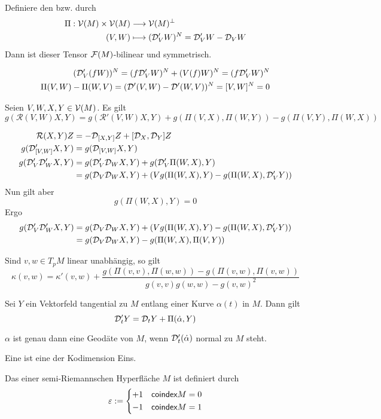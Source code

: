 \documentclass{book}
\newcommand{\Rc}{\mathcal{R}}
\begin{document}
\Lem{}
Definiere den  bzw.  durch
\begin{align*}
\Pi : \mathcal{V}(M) \times \mathcal{V}(M) &\overset{}{\longrightarrow} \mathcal{V}(M)^\bot\\
(V,W) & \longmapsto (\mathcal{D}'_VW)^N = \mathcal{D}'_VW - \mathcal{D}_VW
\end{align*}
Dann ist dieser Tensor $\mathcal{F}(M)$-bilinear und symmetrisch.
\begin{Beweis}{}
\begin{align*}
(\mathcal{D}'_V(fW))^N = (f\mathcal{D}'_VW)^N + (V(f) W)^N = (f\mathcal{D}'_VW)^N\\
\Pi(V,W) - \Pi(W,V) = (\mathcal{D}'(V,W) - \mathcal{D}'(W,V))^N = [V,W]^N = 0
\end{align*}
\end{Beweis}

Seien $V,W,X,Y \in \mathcal{V}(M)$. Es gilt
\[ g(\Rc(V,W)X,Y) = g(\Rc'(V,W)X,Y) + g(\Pi(V,X), \Pi(W,Y )) - g(\Pi(V,Y), \Pi(W,X )) \]
\begin{Beweis}{}
\begin{align*}
\Rc(X,Y)Z &= -\D_{[X,Y]}Z + [\D_X,\D_Y]Z\\
g(\D'_{[V,W]}X,Y) &= g(\D_{[V,W]}X,Y)\\
g(\D'_V\D'_WX,Y) &= g(\D'_V\D_WX,Y) + g(\D'_V \Pi(W,X), Y)\\
&= g(\D_V\D_WX,Y) + (Vg(\Pi(W,X), Y) - g(\Pi(W,X), \D'_VY ))\\
\end{align*}
Nun gilt aber
\[ g(\Pi(W,X), Y) = 0 \]
Ergo
\begin{align*}
g(\mathcal{D}'_V\mathcal{D}'_WX,Y) &= g(\mathcal{D}_V\mathcal{D}_WX,Y) + (Vg(\Pi(W,X), Y) - g(\Pi(W,X), \mathcal{D}'_VY ))\\
&= g(\mathcal{D}_V\mathcal{D}_WX,Y) -g(\Pi(W,X), \Pi(V,Y) )
\end{align*}
\end{Beweis}

\Kor{}
Sind $v,w \in T_pM$ linear unabhängig, so gilt
\[ \kappa(v,w) = \kappa'(v,w) + \frac{g(\Pi(v,v), \Pi(w,w)) - g(\Pi(v,w), \Pi(v,w))}{g(v,v) g(w,w) - g(v,w)^2} \]

\Prop{}
Sei $Y$ ein Vektorfeld tangential zu $M$ entlang einer Kurve $\alpha(t)$ in $M$. Dann gilt
\[ \mathcal{D}_t' Y = \mathcal{D}_tY + \Pi(\dot{\alpha}, Y) \]

\Kor{}
$\alpha$ ist genau dann eine Geodäte von $M$, wenn $\mathcal{D}'_t(\dot{\alpha})$ normal zu $M$ steht.

\Def{}
Eine  ist eine  der Kodimension Eins.

\Def{}
Das  einer semi-Riemannschen Hyperfläche $M$ ist definiert durch
\[ \varepsilon := \left\lbrace 
\begin{aligned}
+1 && \textsf{coindex}M = 0\\
-1 && \textsf{coindex}M = 1
\end{aligned}
\right. \]
\end{document}
